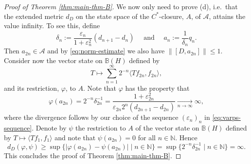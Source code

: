 \documentclass[12pt,a4paper,twoside,reqno]{amsart}
\theoremstyle{plain}
\theoremstyle{definition}
\theoremstyle{remark} %
\theoremstyle{plain}
\numberwithin{equation}{section}
\newcommand{\varps}{{\varepsilon}}
\renewcommand{\leq}{\leqslant}
\renewcommand{\geq}{\geqslant}
\newcommand{\inn}[1]{\langle #1 \rangle}
\newcommand{\A}{{\mathcal{A}}}
\newcommand{\BB}{{\mathbb{B}}}
\newcommand{\NN}{{\mathbb{N}}}
\begin{document}
\begin{proof}[Proof of Theorem \ref{thm:main-thm-B}]
We now only need to prove (d), i.e.~that  the extended metric $d_D$ on the state space of the $C^*$-closure,  $A$, of ${\A}$, attains the value infinity.
To see this,  define
\[
\delta_n:=  \frac{\varps_n}{1+\varps_n^2}(d_{n+1}-d_n) \quad \text{ and } \quad a_n:= \frac{1}{\delta_n}q_n.
\]
Then $a_{2n}\in \A$ and by \eqref{eq:norm-estimate} we also have $\|[D,a_{2n}]\|\leq 1$. Consider now the vector state  on $\BB(H)$ defined by
\[
T\longmapsto \sum_{n=1}^\infty 2^{-n}\inn{Tf_{2n}, f_{2n}},
\]
and its restriction, $\varphi$, to $A$. Note that $\varphi$ has the property that
\[
\varphi(a_{2n})=2^{-n}\delta_{2n}^{-1} =\frac{1+\varps_{2n}^2}{\varps_{2n} 2^n (d_{2n+1}-d_{2n})} \underset{n\to \infty }{\longrightarrow} \infty,
\]
where the divergence follows by our choice of the sequence $(\varps_n)_n$ in \eqref{eq:varps-sequence}.  Denote by $\psi$ the restriction to $A$ of the vector state on $\BB(H)$ defined by $T\mapsto \inn{Tf_1, f_1}$ and note that $\psi(a_{2n})=0$ for all $n\in \NN$. Hence
\[
d_D(\varphi,\psi)\geq \sup\{ |\varphi(a_{2n})-\psi(a_{2n})| \mid n\in \NN \}=\sup\{2^{-n}\delta_{2n}^{-1} \mid n\in \NN \}=\infty.
\]
This concludes the proof of Theorem \ref{thm:main-thm-B}.
\end{proof}
\end{document}
